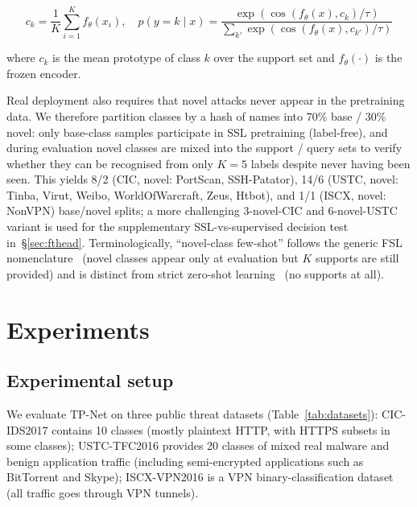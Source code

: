 \documentclass[sensors,article,submit,moreauthors]{Definitions/mdpi}
\begin{document}
\begin{equation}
\label{eq:protonet}
c_k = \frac{1}{K} \sum_{i=1}^{K} f_\theta(x_i), \quad p(y=k \mid x) = \frac{\exp(\cos(f_\theta(x), c_k) / \tau)}{\sum_{k'} \exp(\cos(f_\theta(x), c_{k'}) / \tau)}
\end{equation}

\noindent where $c_k$ is the mean prototype of class $k$ over the support set and $f_\theta(\cdot)$ is the frozen encoder.

Real deployment also requires that novel attacks never appear in the pretraining data. We therefore partition classes by a hash of names into 70\% base / 30\% novel: only base-class samples participate in SSL pretraining (label-free), and during evaluation novel classes are mixed into the support / query sets to verify whether they can be recognised from only $K = 5$ labels despite never having been seen. This yields 8/2 (CIC, novel: PortScan, SSH-Patator), 14/6 (USTC, novel: Tinba, Virut, Weibo, WorldOfWarcraft, Zeus, Htbot), and 1/1 (ISCX, novel: NonVPN) base/novel splits; a more challenging 3-novel-CIC and 6-novel-USTC variant is used for the supplementary SSL-vs-supervised decision test in~\S\ref{sec:fthead}. Terminologically, ``novel-class few-shot'' follows the generic FSL nomenclature~\cite{wang2020fsl} (novel classes appear only at evaluation but $K$ supports are still provided) and is distinct from strict zero-shot learning~\cite{xian2017zeroshot} (no supports at all).

\section{Experiments}
\label{sec:exp}

\subsection{Experimental setup}
\label{sec:setup}

We evaluate TP-Net on three public threat datasets (Table~\ref{tab:datasets}): CIC-IDS2017 \cite{sharafaldin2018cicids} contains 10 classes (mostly plaintext HTTP, with HTTPS subsets in some classes); USTC-TFC2016 \cite{wang2017ustc} provides 20 classes of mixed real malware and benign application traffic (including semi-encrypted applications such as BitTorrent and Skype); ISCX-VPN2016 \cite{draper2016iscx} is a VPN binary-classification dataset (all traffic goes through VPN tunnels).
\end{document}
